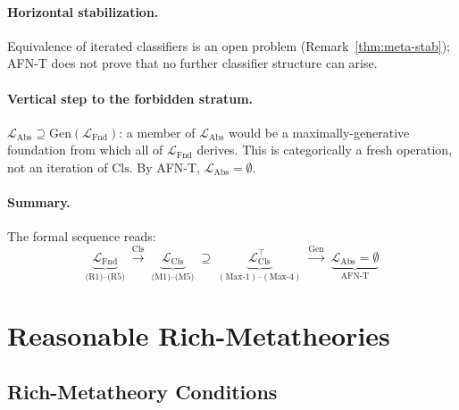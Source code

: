 \documentclass[11pt]{article}
\theoremstyle{plain}
\theoremstyle{definition}
\newcommand{\LFnd}{\mathcal{L}_{\mathrm{Fnd}}}
\newcommand{\LCls}{\mathcal{L}_{\mathrm{Cls}}}
\newcommand{\LClsMax}{\mathcal{L}_{\mathrm{Cls}}^{\top}}
\newcommand{\LAbs}{\mathcal{L}_{\mathrm{Abs}}}
\begin{document}
\paragraph{Horizontal stabilization.} Equivalence of iterated classifiers is an open problem (Remark~\ref{thm:meta-stab}); AFN-T does not prove that no further classifier structure can arise.

\paragraph{Vertical step to the forbidden stratum.} $\LAbs \supseteq \mathrm{Gen}(\LFnd)$: a member of $\LAbs$ would be a maximally-generative foundation from which all of $\LFnd$ derives. This is categorically a fresh operation, not an iteration of $\mathrm{Cls}$. By AFN-T, $\LAbs = \emptyset$.

\paragraph{Summary.} The formal sequence reads:
\[
\underbrace{\LFnd}_{\text{(R1)--(R5)}} \; \xrightarrow{\mathrm{Cls}} \; \underbrace{\LCls}_{\text{(M1)--(M5)}} \; \supseteq \; \underbrace{\LClsMax}_{(\mathrm{Max}\text{-1})\text{--}(\mathrm{Max}\text{-4})} \; \xrightarrow{\mathrm{Gen}} \; \underbrace{\LAbs = \emptyset}_{\text{AFN-T}}
\]

\section{Reasonable Rich-Metatheories}\label{sec:rs}

\subsection{Rich-Metatheory Conditions}
\end{document}
